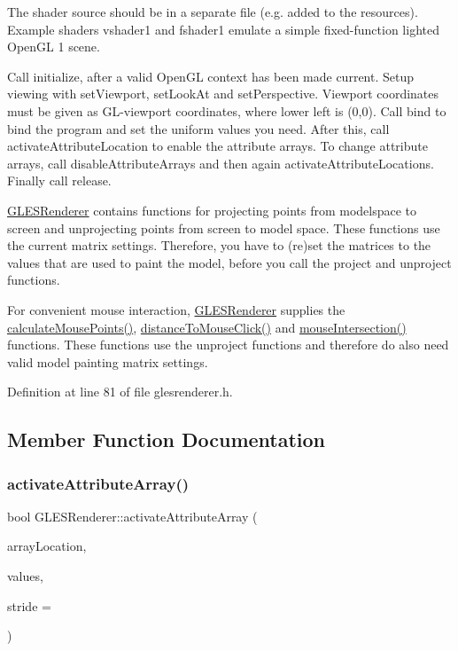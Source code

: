 The shader source should be in a separate file (e.\+g. added to the resources). Example shaders vshader1 and fshader1 emulate a simple fixed-\/function lighted Open\+GL 1 scene.

Call initialize, after a valid Open\+GL context has been made current. Setup viewing with set\+Viewport, set\+Look\+At and set\+Perspective. Viewport coordinates must be given as G\+L-\/viewport coordinates, where lower left is (0,0). Call bind to bind the program and set the uniform values you need. After this, call activate\+Attribute\+Location to enable the attribute arrays. To change attribute arrays, call disable\+Attribute\+Arrays and then again activate\+Attribute\+Locations. Finally call release.

\mbox{\hyperlink{class_g_l_e_s_renderer}{G\+L\+E\+S\+Renderer}} contains functions for projecting points from modelspace to screen and unprojecting points from screen to model space. These functions use the current matrix settings. Therefore, you have to (re)set the matrices to the values that are used to paint the model, before you call the project and unproject functions.

For convenient mouse interaction, \mbox{\hyperlink{class_g_l_e_s_renderer}{G\+L\+E\+S\+Renderer}} supplies the \mbox{\hyperlink{class_g_l_e_s_renderer_ae600d289f94594374cdbd8c031cb0c86}{calculate\+Mouse\+Points()}}, \mbox{\hyperlink{class_g_l_e_s_renderer_a6f31b6893897549f3762a88a8bf135f8}{distance\+To\+Mouse\+Click()}} and \mbox{\hyperlink{class_g_l_e_s_renderer_a2c8f6b6ff0df6acafc6cbd7a82678a17}{mouse\+Intersection()}} functions. These functions use the unproject functions and therefore do also need valid model painting matrix settings. 

Definition at line 81 of file glesrenderer.\+h.



\subsection{Member Function Documentation}
\mbox{\label{class_g_l_e_s_renderer_a8529c317862c57c027acce876bad17bb}} 
\subsubsection{\texorpdfstring{activateAttributeArray()}{activateAttributeArray()}\hspace{0.1cm}{\footnotesize\ttfamily [1/4]}}
{\footnotesize\ttfamily bool G\+L\+E\+S\+Renderer\+::activate\+Attribute\+Array (\begin{DoxyParamCaption}\item[{Attribute\+Location}]{array\+Location,  }\item[{const Q\+Vector2D $\ast$}]{values,  }\item[{int}]{stride = {} }\end{DoxyParamCaption})}


